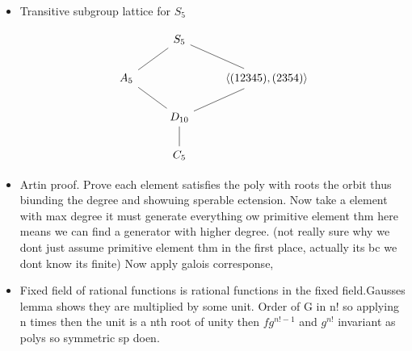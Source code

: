 \documentclass{article}
\begin{document}
\begin{itemize}
        \item Transitive subgroup lattice for $S_5$
        \begin{center}\[\centering \begin{tikzcd}
	& {S_5} \\
	{A_5} && {\langle(12345),(2354)\rangle} \\
	& {D_{10}} \\
	& {C_5}
	\arrow[no head, from=1-2, to=2-1]
	\arrow[no head, from=1-2, to=2-3]
	\arrow[no head, from=2-3, to=3-2]
	\arrow[no head, from=3-2, to=2-1]
	\arrow[no head, from=3-2, to=4-2]
\end{tikzcd}\]\end{center}

\item Artin proof. Prove each element satisfies the poly with roots the orbit thus biunding the degree and showuing sperable ectension. Now take a element with max degree it must  generate everything ow primitive element thm here means we can find a generator with higher degree. (not really sure why we dont just assume primitive element thm in the first place, actually its bc we dont know its finite) Now apply galois corresponse,
\item Fixed field of rational functions is rational functions in the fixed field.Gausses lemma shows they are multiplied by some unit. Order of G in n! so applying n times then the unit is a nth root of unity then $fg^{n!-1}$ and $g^{n!}$ invariant as polys so symmetric sp doen.
\end{itemize}
\end{document}
